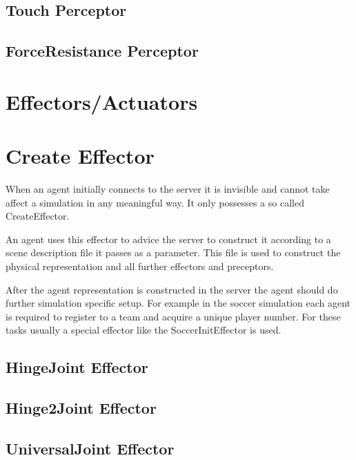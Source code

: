 \subsection{Touch Perceptor}
\subsection{ForceResistance Perceptor}

\section{Effectors/Actuators}


\section{Create Eﬀector}

When an agent initially connects to the server it is invisible and
cannot take affect a simulation in any meaningful way. It only
possesses a so called CreateEffector.

An agent uses this effector to advice the server to construct it
according to a scene description file it passes as a parameter. This
file is used to construct the physical representation and all further
effectors and preceptors.

After the agent representation is constructed in the server the agent
should do further simulation specific setup. For example in the soccer
simulation each agent is required to register to a team and acquire a
unique player number. For these tasks usually a special effector like
the SoccerInitEffector is used.


\subsection{HingeJoint Effector}

\subsection{Hinge2Joint Effector}

\subsection{UniversalJoint Effector}

